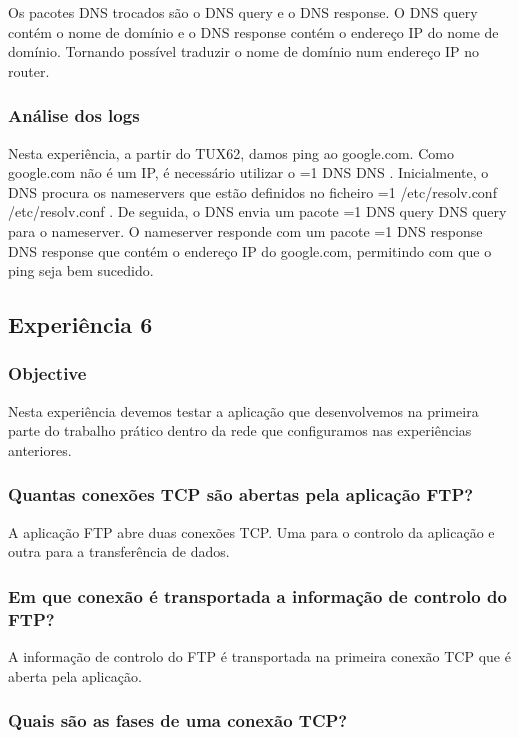 \documentclass[11pt,a4paper,twocolumn]{article}
\newcommand{\hl}[2][1]{%
  \ifnum#1=1\relax
    \textcolor{text-hl1}{#2}%
  \else
    \textcolor{text-hl2}{#2}%
  \fi
}
\begin{document}
Os pacotes DNS  trocados são o DNS query e o DNS response. O DNS query contém o nome de domínio e o DNS response contém o endereço IP do nome de domínio. Tornando possível traduzir o nome de domínio num endereço IP no router.

\subsubsection{Análise dos logs}

Nesta experiência, a partir do TUX62, damos ping ao google.com. Como google.com não é um IP, é necessário utilizar o \hl{DNS}. 
Inicialmente, o DNS procura os nameservers que estão definidos no ficheiro \hl{/etc/resolv.conf}. De seguida, o DNS envia um pacote \hl{DNS query} para o nameserver. O nameserver responde com um pacote \hl{DNS response} que contém o endereço IP do google.com, permitindo com que o ping seja bem sucedido.

\subsection{Experiência 6}

\subsubsection{Objective} 

Nesta experiência devemos testar a aplicação que desenvolvemos na primeira parte do trabalho prático dentro da rede que configuramos nas experiências anteriores.

\subsubsection{Quantas conexões TCP são abertas pela aplicação FTP?}

A aplicação FTP abre duas conexões TCP. Uma para o controlo da aplicação e outra para a transferência de dados.

\subsubsection{Em que conexão é transportada a informação de controlo do FTP?}

A informação de controlo do FTP é transportada na primeira conexão TCP que é aberta pela aplicação.

\subsubsection{Quais são as fases de uma conexão TCP?}
\end{document}
